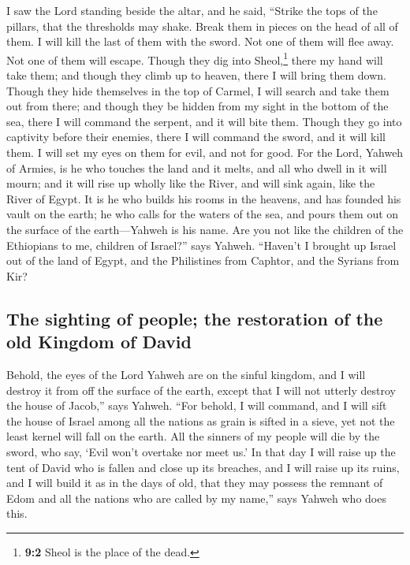  I saw the Lord standing beside the altar, and he said,
``Strike the tops of the pillars, that the thresholds may shake. Break
them in pieces on the head of all of them. I will kill the last of them
with the sword. Not one of them will flee away. Not one of them will
escape.  Though they dig into Sheol,\footnote{\textbf{9:2}
  Sheol is the place of the dead.} there my hand will take them; and
though they climb up to heaven, there I will bring them down.
 Though they hide themselves in the top of Carmel, I will
search and take them out from there; and though they be hidden from my
sight in the bottom of the sea, there I will command the serpent, and it
will bite them.  Though they go into captivity before
their enemies, there I will command the sword, and it will kill them. I
will set my eyes on them for evil, and not for good.  For
the Lord, Yahweh of Armies, is he who touches the land and it melts, and
all who dwell in it will mourn; and it will rise up wholly like the
River, and will sink again, like the River of Egypt.  It
is he who builds his rooms in the heavens, and has founded his vault on
the earth; he who calls for the waters of the sea, and pours them out on
the surface of the earth---Yahweh is his name.  Are you
not like the children of the Ethiopians to me, children of Israel?''
says Yahweh. ``Haven't I brought up Israel out of the land of Egypt, and
the Philistines from Caphtor, and the Syrians from Kir?

\hypertarget{the-sighting-of-people-the-restoration-of-the-old-kingdom-of-david}{%
\subsection{The sighting of people; the restoration of the old Kingdom
of
David}\label{the-sighting-of-people-the-restoration-of-the-old-kingdom-of-david}}

 Behold, the eyes of the Lord Yahweh are on the sinful
kingdom, and I will destroy it from off the surface of the earth, except
that I will not utterly destroy the house of Jacob,'' says Yahweh.
 ``For behold, I will command, and I will sift the house
of Israel among all the nations as grain is sifted in a sieve, yet not
the least kernel will fall on the earth.  All the sinners
of my people will die by the sword, who say, `Evil won't overtake nor
meet us.'  In that day I will raise up the tent of David
who is fallen and close up its breaches, and I will raise up its ruins,
and I will build it as in the days of old,  that they may
possess the remnant of Edom and all the nations who are called by my
name,'' says Yahweh who does this.

